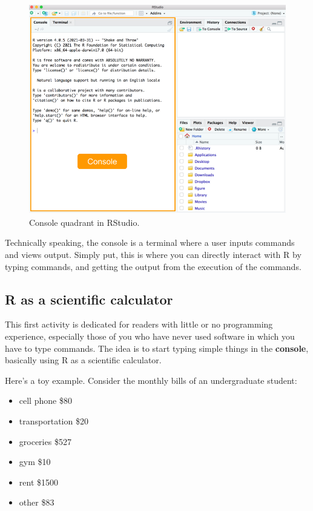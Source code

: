 \documentclass[
]{book}
\providecommand{\tightlist}{%
  \setlength{\itemsep}{0pt}\setlength{\parskip}{0pt}}
\begin{document}
\begin{figure}

{\centering \includegraphics[width=0.7\linewidth]{images/rstudio/rstudio-console-first-time} 

}

\caption{Console quadrant in RStudio.}\label{fig:unnamed-chunk-15}
\end{figure}

Technically speaking, the console is a terminal where a user inputs commands and
views output. Simply put, this is where you can directly interact with R by
typing commands, and getting the output from the execution of the commands.

\hypertarget{r-as-a-scientific-calculator}{%
\subsection{R as a scientific calculator}\label{r-as-a-scientific-calculator}}

This first activity is dedicated for readers with little or no programming
experience, especially those of you who have never used software in which you
have to type commands. The idea is to start typing simple things in the
\textbf{console}, basically using R as a scientific calculator.

Here's a toy example. Consider the monthly bills of an undergraduate student:

\begin{itemize}
\tightlist
\item
  cell phone \$80
\item
  transportation \$20
\item
  groceries \$527
\item
  gym \$10
\item
  rent \$1500
\item
  other \$83
\end{itemize}
\end{document}
